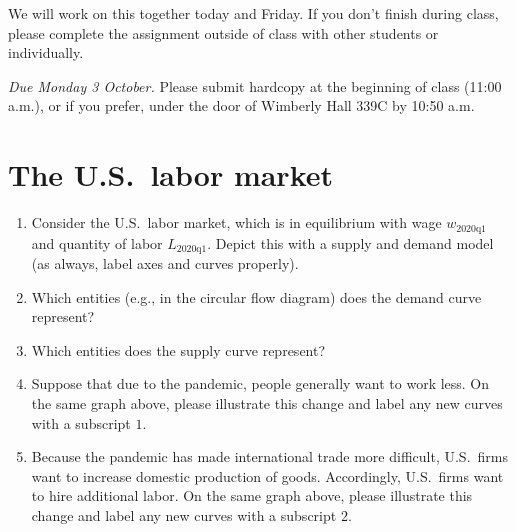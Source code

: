 \documentclass{assignment}
\date{Wednesday 28 September 2022}
\begin{document}
\RaggedRight

\beginassignment{}

We will work on this together today and Friday. If you don't finish during class, please complete the assignment outside of class with other students or individually.

\emph{Due Monday 3 October.} Please submit hardcopy at the beginning of class (11:00 a.m.), or if you prefer, under the door of Wimberly Hall 339C by 10:50 a.m.

\section*{The U.S.~labor market}

\begin{enumerate}

\item Consider the U.S.~labor market, which is in equilibrium with wage $w_\text{2020q1}$ and quantity of labor $L_\text{2020q1}$. Depict this with a supply and demand model (as always, label axes and curves properly).

\begin{center}
\end{center}

\item Which entities (e.g., in the circular flow diagram) does the demand curve represent?

\vfill

\item Which entities does the supply curve represent?

\vfill

\item Suppose that due to the pandemic, people generally want to work less. On the same graph above, please illustrate this change and label any new curves with a subscript $1$.

\item Because the pandemic has made international trade more difficult, U.S.~firms want to increase domestic production of goods. Accordingly, U.S.~firms want to hire additional labor. On the same graph above, please illustrate this change and label any new curves with a subscript $2$.


\end{enumerate}
\end{document}

